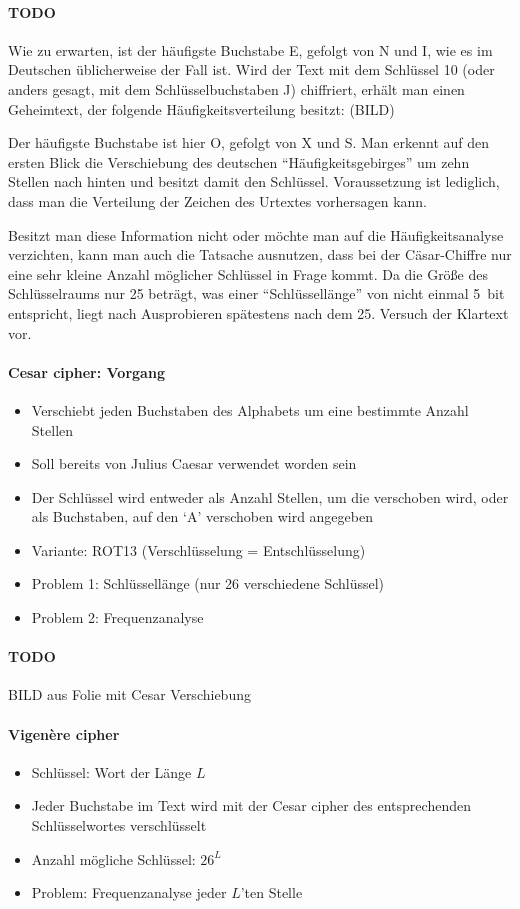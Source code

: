 \documentclass[10pt,a4paper]{article}
\begin{document}
\paragraph*{TODO}Wie zu erwarten, ist der häufigste Buchstabe E, gefolgt von N und I, wie es im Deutschen üblicherweise der Fall ist. Wird der Text mit dem Schlüssel 10 (oder anders gesagt, mit dem Schlüsselbuchstaben J) chiffriert, erhält man einen Geheimtext, der folgende Häufigkeitsverteilung besitzt: (BILD)


Der häufigste Buchstabe ist hier O, gefolgt von X und S. Man erkennt auf den ersten Blick die Verschiebung des deutschen "`Häufigkeitsgebirges"' um zehn Stellen nach hinten und besitzt damit den Schlüssel. Voraussetzung ist lediglich, dass man die Verteilung der Zeichen des Urtextes vorhersagen kann.


Besitzt man diese Information nicht oder möchte man auf die Häufigkeitsanalyse verzichten, kann man auch die Tatsache ausnutzen, dass bei der Cäsar-Chiffre nur eine sehr kleine Anzahl möglicher Schlüssel in Frage kommt. Da die Größe des Schlüsselraums nur 25 beträgt, was einer "`Schlüssellänge"' von nicht einmal 5~bit entspricht, liegt nach Ausprobieren spätestens nach dem 25. Versuch der Klartext vor.

\paragraph*{Cesar cipher: Vorgang}
\begin{itemize}[noitemsep,topsep=0pt,leftmargin=*]
    \item Verschiebt jeden Buchstaben des Alphabets um eine bestimmte Anzahl Stellen
    \item Soll bereits von Julius Caesar verwendet worden sein
    \item Der Schlüssel wird entweder als Anzahl Stellen, um die verschoben wird, oder als Buchstaben, auf den `A' verschoben wird angegeben
    \item Variante: ROT13 (Verschlüsselung = Entschlüsselung)
    \item Problem 1: Schlüssellänge (nur 26 verschiedene Schlüssel)
    \item Problem 2: Frequenzanalyse
\end{itemize}
\paragraph*{TODO}BILD aus Folie mit Cesar Verschiebung
\paragraph*{Vigenère cipher}
\begin{itemize}[noitemsep,topsep=0pt,leftmargin=*]
    \item Schlüssel: Wort der Länge $L$
    \item Jeder Buchstabe im Text wird mit der Cesar cipher des entsprechenden Schlüsselwortes verschlüsselt
    \item Anzahl mögliche Schlüssel: $26^L$
    \item Problem: Frequenzanalyse jeder $L$'ten Stelle
\end{itemize}
\end{document}
